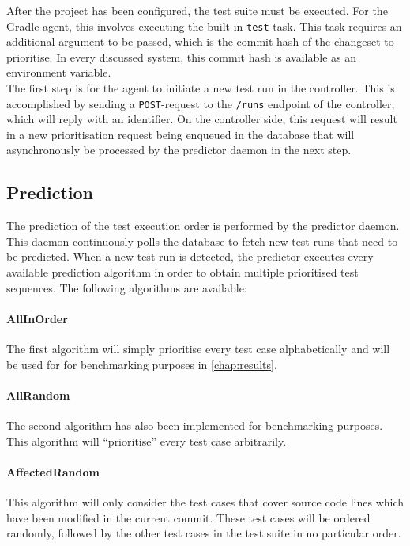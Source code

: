 \noindent After the project has been configured, the test suite must be executed. For the Gradle agent, this involves executing the built-in \texttt{test} task. This task requires an additional argument to be passed, which is the commit hash of the changeset to prioritise. In every discussed \CI{} system, this commit hash is available as an environment variable.\\

\noindent The first step is for the agent to initiate a new test run in the controller. This is accomplished by sending a \texttt{POST}-request to the \texttt{/runs} endpoint of the controller, which will reply with an identifier. On the controller side, this request will result in a new prioritisation request being enqueued in the database that will asynchronously be processed by the predictor daemon in the next step.

\subsection{Prediction}
The prediction of the test execution order is performed by the predictor daemon. This daemon continuously polls the database to fetch new test runs that need to be predicted. When a new test run is detected, the predictor executes every available prediction algorithm in order to obtain multiple prioritised test sequences. The following algorithms are available:

\paragraph*{AllInOrder} The first algorithm will simply prioritise every test case alphabetically and will be used for for benchmarking purposes in \autoref{chap:results}.

\paragraph*{AllRandom} The second algorithm has also been implemented for benchmarking purposes. This algorithm will ``prioritise'' every test case arbitrarily.

\paragraph*{AffectedRandom} This algorithm will only consider the test cases that cover source code lines which have been modified in the current commit. These test cases will be ordered randomly, followed by the other test cases in the test suite in no particular order.

